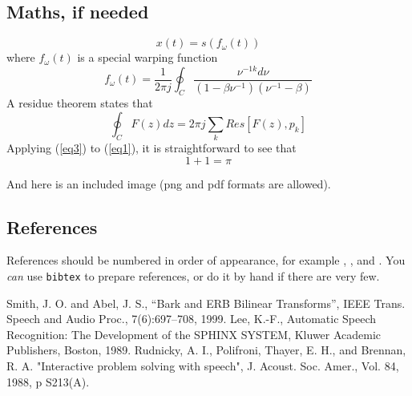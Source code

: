 \documentclass[10pt,a4paper,oneclumn]{article}
\begin{document}
\subsection{Maths, if needed}

%
\begin{equation}
x(t) = s(f_\omega(t))
\label{eq1}
\end{equation}
where \(f_\omega(t)\) is a special warping function
\begin{equation}
f_\omega(t)=\frac{1}{2\pi j}\oint_C \frac{\nu^{-1k}d\nu}
{(1-\beta\nu^{-1})(\nu^{-1}-\beta)}
\label{eq2}
\end{equation}
A residue theorem states that
\begin{equation}
\oint_C F(z)dz=2 \pi j \sum_k Res[F(z),p_k]
\label{eq3}
\end{equation}
Applying (\ref{eq3}) to (\ref{eq1}), 
it is straightforward to see that
\begin{equation}
1 + 1 = \pi
\label{eq4}
\end{equation}

And here is an included image (png and pdf formats are allowed).

\subsection{References}

References should be numbered in order of appearance, 
for example \cite{ES1}, \cite{ES2}, and \cite{ES3}. 
You \emph{can} use \texttt{bibtex} to prepare references,
or do it by hand if there are very few.

%

\begin{thebibliography}{10}
 Smith, J. O. and Abel, J. S., 
``Bark and {ERB} Bilinear Transforms'', 
IEEE Trans. Speech and Audio Proc., 7(6):697--708, 1999.  
 Lee, K.-F., Automatic Speech Recognition: 
The Development of the 
SPHINX SYSTEM, Kluwer Academic Publishers, Boston, 1989.
 Rudnicky, A. I., Polifroni, Thayer, E. H.,
 and Brennan, R. A.  
"Interactive problem solving with speech", J. Acoust. Soc. Amer., 
Vol. 84, 1988, p S213(A).
\end{thebibliography}
\end{document}
